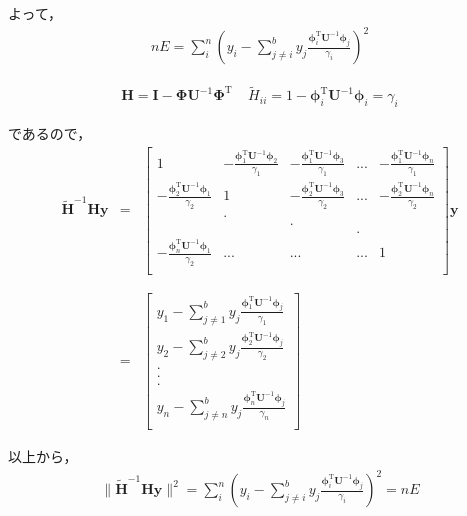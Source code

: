 \documentclass[fleqn]{jsarticle}
\begin{document}
  よって，
  \begin{eqnarray*}
    nE = \sum_i^n \left( y_i - \sum_{j \neq i}^b y_j \frac{ \mathbf{\phi}_i^\mathrm{T} \mathbf{U}^{-1} \mathbf{\phi}_j }{\gamma_i} \right)^2
  \end{eqnarray*}

  \vspace{10em}
  \begin{eqnarray*}
    \mathbf{H} = \mathbf{I} - \mathbf{\Phi} \mathbf{U}^{-1} \mathbf{\Phi}^\mathrm{T}\ \ \ \ \
    \tilde{H}_{ii} = 1 - \mathbf{\phi}_i^\mathrm{T} \mathbf{U}^{-1} \mathbf{\phi}_i = \gamma_i
  \end{eqnarray*}

  であるので，
  \begin{eqnarray*}
    \tilde{\mathbf{H}}^{-1} \mathbf{H} \mathbf{y} &=&
      \begin{bmatrix}
        1 &-\frac{\mathbf{\phi}_1^\mathrm{T} \mathbf{U}^{-1} \mathbf{\phi}_2}{\gamma_1}
          &-\frac{\mathbf{\phi}_1^\mathrm{T} \mathbf{U}^{-1} \mathbf{\phi}_3}{\gamma_1}
          & ...
          &-\frac{\mathbf{\phi}_1^\mathrm{T} \mathbf{U}^{-1} \mathbf{\phi}_n}{\gamma_1}\\
        -\frac{\mathbf{\phi}_2^\mathrm{T} \mathbf{U}^{-1} \mathbf{\phi}_1}{\gamma_2}
          & 1
          &-\frac{\mathbf{\phi}_2^\mathrm{T} \mathbf{U}^{-1} \mathbf{\phi}_3}{\gamma_2}
          & ...
          &-\frac{\mathbf{\phi}_2^\mathrm{T} \mathbf{U}^{-1} \mathbf{\phi}_n}{\gamma_2}\\
        &.\\&&.\\&&&.\\
        -\frac{\mathbf{\phi}_n^\mathrm{T} \mathbf{U}^{-1} \mathbf{\phi}_1}{\gamma_2}
        & ...
        & ...
        & ...
        & 1\\
      \end{bmatrix}
      \mathbf{y}\\ \\ \\
    &=&
      \begin{bmatrix}
        y_1 - \sum_{j \neq 1}^b y_j \frac{ \mathbf{\phi}_1^\mathrm{T} \mathbf{U}^{-1} \mathbf{\phi}_j }{\gamma_1}\\
        y_2 - \sum_{j \neq 2}^b y_j \frac{ \mathbf{\phi}_2^\mathrm{T} \mathbf{U}^{-1} \mathbf{\phi}_j }{\gamma_2}\\
        .\\
        .\\
        .\\
        y_n - \sum_{j \neq n}^b y_j \frac{ \mathbf{\phi}_n^\mathrm{T} \mathbf{U}^{-1} \mathbf{\phi}_j }{\gamma_n}\\
      \end{bmatrix}
  \end{eqnarray*}

  以上から，
  \begin{eqnarray*}
    \| \tilde{\mathbf{H}}^{-1} \mathbf{H} \mathbf{y} \|^2 = \sum_i^n \left( y_i - \sum_{j \neq i}^b y_j \frac{ \mathbf{\phi}_i^\mathrm{T} \mathbf{U}^{-1} \mathbf{\phi}_j }{\gamma_i} \right)^2 = nE
  \end{eqnarray*}
\end{document}
